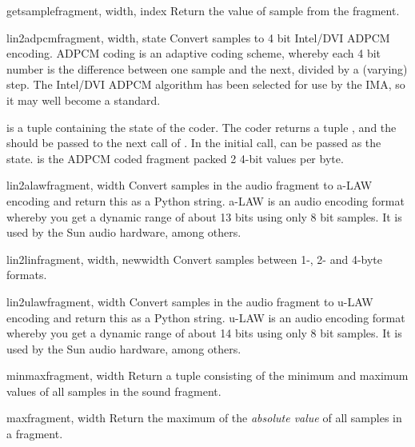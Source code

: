 \begin{funcdesc}{getsample}{fragment, width, index}
Return the value of sample  from the fragment.
\end{funcdesc}

\begin{funcdesc}{lin2adpcm}{fragment, width, state}
Convert samples to 4 bit Intel/DVI ADPCM encoding.  ADPCM coding is an
adaptive coding scheme, whereby each 4 bit number is the difference
between one sample and the next, divided by a (varying) step.  The
Intel/DVI ADPCM algorithm has been selected for use by the IMA, so it
may well become a standard.

 is a tuple containing the state of the coder.  The coder
returns a tuple , and the
 should be passed to the next call of
.  In the initial call,  can be
passed as the state.   is the ADPCM coded fragment
packed 2 4-bit values per byte.
\end{funcdesc}

\begin{funcdesc}{lin2alaw}{fragment, width}
Convert samples in the audio fragment to a-LAW encoding and return
this as a Python string.  a-LAW is an audio encoding format whereby
you get a dynamic range of about 13 bits using only 8 bit samples.  It
is used by the Sun audio hardware, among others.
\end{funcdesc}

\begin{funcdesc}{lin2lin}{fragment, width, newwidth}
Convert samples between 1-, 2- and 4-byte formats.
\end{funcdesc}

\begin{funcdesc}{lin2ulaw}{fragment, width}
Convert samples in the audio fragment to u-LAW encoding and return
this as a Python string.  u-LAW is an audio encoding format whereby
you get a dynamic range of about 14 bits using only 8 bit samples.  It
is used by the Sun audio hardware, among others.
\end{funcdesc}

\begin{funcdesc}{minmax}{fragment, width}
Return a tuple consisting of the minimum and maximum values of all
samples in the sound fragment.
\end{funcdesc}

\begin{funcdesc}{max}{fragment, width}
Return the maximum of the \emph{absolute value} of all samples in a
fragment.
\end{funcdesc}

